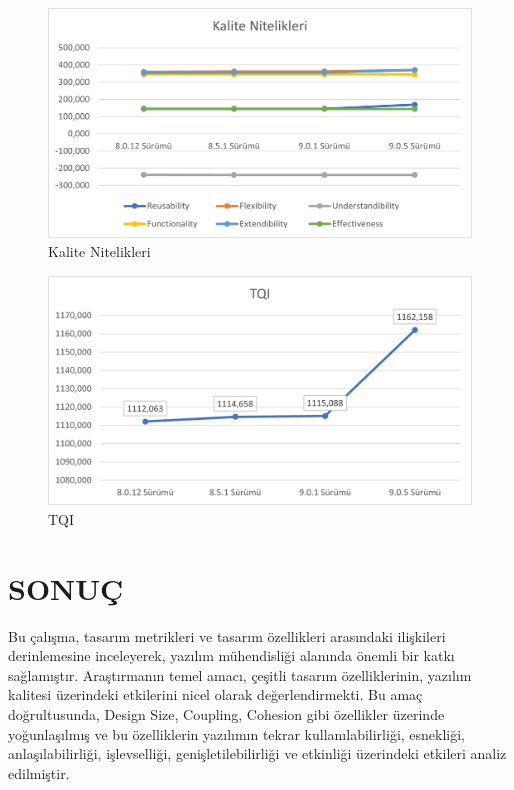 \documentclass[conference]{IEEEtran}
\begin{document}
\begin{figure}[h]
	\centering
	\includegraphics[scale=0.6]{nitelik.png}
	\caption{Kalite Nitelikleri}
	\label{sekil2}
\end{figure}

\begin{figure}[h]
	\centering
	\includegraphics[scale=0.6]{tqi.png}
	\caption{TQI}
	\label{sekil3}
\end{figure}

\section{SONUÇ}

Bu çalışma, tasarım metrikleri ve tasarım özellikleri arasındaki ilişkileri derinlemesine inceleyerek, yazılım mühendisliği alanında önemli bir katkı sağlamıştır. Araştırmanın temel amacı, çeşitli tasarım özelliklerinin, yazılım kalitesi üzerindeki etkilerini nicel olarak değerlendirmekti. Bu amaç doğrultusunda, Design Size, Coupling, Cohesion gibi özellikler üzerinde yoğunlaşılmış ve bu özelliklerin yazılımın tekrar kullanılabilirliği, esnekliği, anlaşılabilirliği, işlevselliği, genişletilebilirliği ve etkinliği üzerindeki etkileri analiz edilmiştir.
\end{document}
